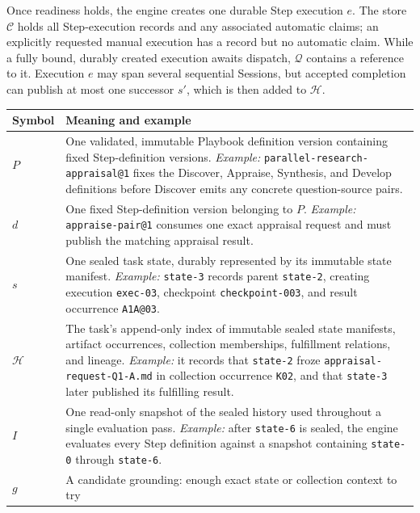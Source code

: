 \documentclass[11pt]{article}
\begin{document}
Once readiness holds, the engine creates one durable Step execution \(e\).
The store \(\mathcal{C}\) holds all Step-execution records and any associated
automatic claims; an explicitly requested manual execution has a record but no
automatic claim. While a fully bound, durably created execution awaits
dispatch, \(\mathcal{Q}\) contains a reference to it. Execution \(e\) may span
several sequential Sessions, but accepted completion can publish at most one
successor \(s'\), which is then added to \(\mathcal{H}\).

\begin{tabularx}{\textwidth}{@{}L{0.68in}Y@{}}
\toprule
\textbf{Symbol} & \textbf{Meaning and example} \\
\midrule
\(P\) & One validated, immutable Playbook definition version containing fixed
Step-definition versions. \newline\emph{Example:}
\texttt{parallel-research-appraisal@1} fixes the
Discover, Appraise, Synthesis, and Develop definitions before Discover emits
any concrete question-source pairs. \\
\(d\) & One fixed Step-definition version belonging to \(P\).
\newline\emph{Example:} \texttt{appraise-pair@1} consumes one exact appraisal
request and must publish the matching appraisal result. \\
\(s\) & One sealed task state, durably represented by its immutable state
manifest. \newline\emph{Example:} \texttt{state-3} records parent
\texttt{state-2}, creating execution \texttt{exec-03}, checkpoint
\texttt{checkpoint-003}, and result occurrence \texttt{A1A@03}. \\
\(\mathcal{H}\) & The task's append-only index of immutable sealed state
manifests, artifact occurrences, collection memberships, fulfillment
relations, and lineage. \newline\emph{Example:} it records that \texttt{state-2} froze
\texttt{appraisal-request-Q1-A.md} in collection occurrence \texttt{K02}, and
that \texttt{state-3} later published its fulfilling result. \\
\(I\) & One read-only snapshot of the sealed history used throughout a single
evaluation pass. \newline\emph{Example:} after \texttt{state-6} is sealed, the
engine evaluates every Step definition against a snapshot containing
\texttt{state-0} through \texttt{state-6}. \\
\(g\) & A candidate grounding: enough exact state or collection context to try

\end{tabularx}
\end{document}

